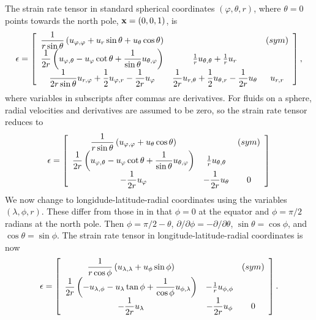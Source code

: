 \documentclass[11pt]{report}
\begin{document}
The strain rate tensor in standard spherical coordinates $(\varphi,\theta,r)$, where $\theta=0$ points towards the north pole, ${\bf x}=(0,0,1)$, is \cite[p. 868]{Kundu_ea12bk}
\begin{eqnarray}
\epsilon = \left[\begin{array}{ccc}
\displaystyle
\frac{1}{r\sin\theta} \left( u_{\varphi,\varphi} + u_r\sin\theta +  u_\theta\cos\theta \right) &  & (sym) \\
\displaystyle
\frac{1}{2r}\left(u_{\varphi,\theta} - u_\varphi \cot\theta  +  \frac{1}{\sin\theta}u_{\theta,\varphi}  \right)
\displaystyle
   & \frac{1}{r} u_{\theta,\theta} + \frac{1}{r} u_{r} & \\
\displaystyle
\frac{1}{2r\sin\theta}u_{r,\varphi} + \frac{1}{2}u_{\varphi,r} - \frac{1}{2r}u_\varphi &  
\displaystyle
\frac{1}{2r}u_{r,\theta} + \frac{1}{2}u_{\theta,r} - \frac{1}{2r}u_\theta  & u_{r,r}
\end{array}\right],
\end{eqnarray}
where variables in subscripts after commas are derivatives.  For fluids on a sphere, radial velocities and derivatives are assumed to be zero, so the strain rate tensor reduces to
\begin{eqnarray}
\epsilon = \left[\begin{array}{ccc}
\displaystyle
\frac{1}{r\sin\theta} \left( u_{\varphi,\varphi} +  u_\theta\cos\theta \right) &  & (sym) \\
\displaystyle
\frac{1}{2r}\left(u_{\varphi,\theta} - u_\varphi \cot\theta  +  \frac{1}{\sin\theta}u_{\theta,\varphi}  \right)
\displaystyle
   & \frac{1}{r} u_{\theta,\theta}  & \\
\displaystyle
 - \frac{1}{2r}u_\varphi &  
\displaystyle
 - \frac{1}{2r}u_\theta  & 0
\end{array}\right]
\end{eqnarray}
We now change to longidude-latitude-radial coordinates using the variables $(\lambda, \phi, r)$.  These differ from those in \cite{Kundu_ea12bk} in that $\phi=0$ at the equator and $\phi=\pi/2$ radians at the north pole.  Then $\phi=\pi/2-\theta$, $\partial/\partial\phi=-\partial/\partial\theta$, $\sin\theta=\cos\phi$, and $\cos\theta=\sin\phi$.  The strain rate tensor in longitude-latitude-radial coordinates is now
\begin{eqnarray}
\epsilon = \left[\begin{array}{ccc}
\displaystyle
\frac{1}{r\cos\phi} \left( u_{\lambda,\lambda} +  u_\phi\sin\phi \right) &  & (sym) \\
\displaystyle
\frac{1}{2r}\left(-u_{\lambda,\phi} - u_\lambda \tan\phi  +  \frac{1}{\cos\phi}u_{\phi,\lambda}  \right)
\displaystyle
   & -\frac{1}{r} u_{\phi,\phi}  & \\
\displaystyle
 - \frac{1}{2r}u_\lambda &  
\displaystyle
 - \frac{1}{2r}u_\phi  & 0
\end{array}\right].
\end{eqnarray}
\end{document}
